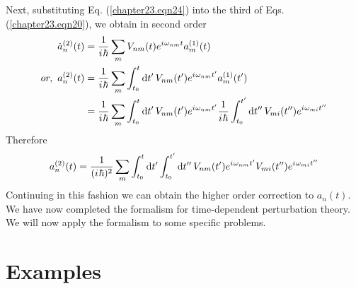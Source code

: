 Next, substituting Eq. (\ref{chapter23.eqn24}) into the third of Eqs. (\ref{chapter23.eqn20}), we obtain in second order
\begin{align*}
	\dot{a}_n^{(2)}(t) &= \frac{1}{{i\mkern1mu} \hbar} \sum_{m} V_{n m}(t) e^{{i\mkern1mu} \omega_{n m} t} a_m^{(1)}(t) \\
	or,\ a_n^{(2)}(t) &= \frac{1}{{i\mkern1mu} \hbar} \sum_{m} \int_{t_0}^{t} \dd{t^\prime} V_{n m}(t^\prime) e^{{i\mkern1mu} \omega_{n m} t^\prime} a_m^{(1)}(t^\prime) \\
	&=\frac{1}{{i\mkern1mu} \hbar} \sum_{m} \int_{t_0}^{t} \dd{t^\prime} V_{n m}(t^\prime) e^{{i\mkern1mu} \omega_{n m} t^\prime} 
	\frac{1}{{i\mkern1mu} \hbar} \int_{t_0}^{t^\prime} \dd{t^{\prime\prime}} V_{m i}(t^{\prime\prime}) e^{{i\mkern1mu} \omega_{m i} t^{\prime\prime}}
\end{align*}
Therefore
\begin{equation}
\label{chapter23.eqn25}
a_n^{(2)}(t) = \frac{1}{({i\mkern1mu} \hbar)^2} \sum_{m} \int_{t_0}^{t} \dd{t^\prime} \int_{t_0}^{t^\prime} \dd{t^{\prime\prime}} V_{n m}(t^\prime) e^{{i\mkern1mu} \omega_{n m} t^\prime} V_{m i}(t^{\prime\prime}) e^{{i\mkern1mu} \omega_{m i} t^{\prime\prime}}
\end{equation}
Continuing in this fashion we can obtain the higher order correction to $a_n(t)$. \\

We have now completed the formalism for time-dependent perturbation theory. We will now apply the formalism to some specific problems.



\section{Examples}
